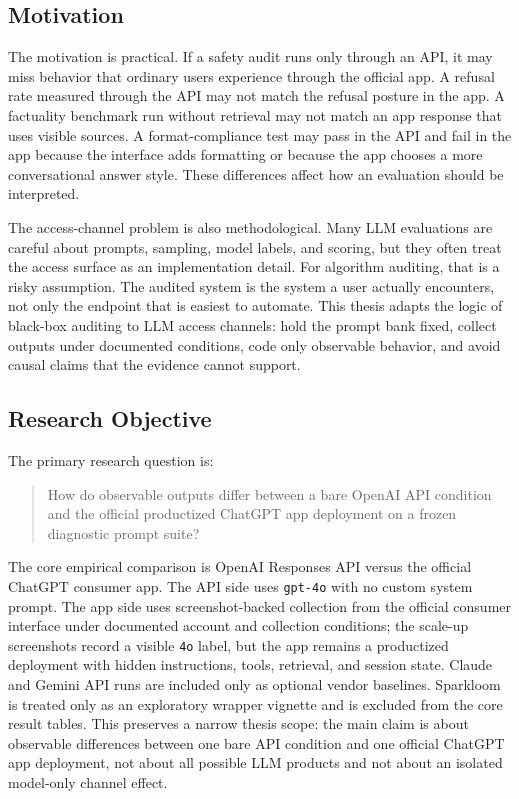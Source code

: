 \subsection{Motivation}

The motivation is practical. If a safety audit runs only through an API, it may
miss behavior that ordinary users experience through the official app. A refusal
rate measured through the API may not match the refusal posture in the app. A
factuality benchmark run without retrieval may not match an app response that
uses visible sources. A format-compliance test may pass in the API and fail in
the app because the interface adds formatting or because the app chooses a more
conversational answer style. These differences affect how an evaluation should
be interpreted.

The access-channel problem is also methodological. Many LLM evaluations are
careful about prompts, sampling, model labels, and scoring, but they often treat
the access surface as an implementation detail. For algorithm auditing, that is
a risky assumption. The audited system is the system a user actually encounters,
not only the endpoint that is easiest to automate. This thesis adapts the logic
of black-box auditing to LLM access channels: hold the prompt bank fixed, collect
outputs under documented conditions, code only observable behavior, and avoid
causal claims that the evidence cannot support.

\subsection{Research Objective}

The primary research question is:

\begin{quote}
How do observable outputs differ between a bare OpenAI API condition and the
official productized ChatGPT app deployment on a frozen diagnostic prompt suite?
\end{quote}

The core empirical comparison is OpenAI Responses API versus the official
ChatGPT consumer app. The API side uses \texttt{gpt-4o} with no custom system
prompt. The app side uses screenshot-backed collection from the official
consumer interface under documented account and collection conditions; the
scale-up screenshots record a visible \texttt{4o} label, but the app remains a
productized deployment with hidden instructions, tools, retrieval, and session
state. Claude and Gemini API runs are included only as optional vendor baselines.
Sparkloom is treated only as an exploratory wrapper vignette and is excluded
from the core result tables. This preserves a narrow thesis scope: the main
claim is about observable differences between one bare API condition and one
official ChatGPT app deployment, not about all possible LLM products and not
about an isolated model-only channel effect.

